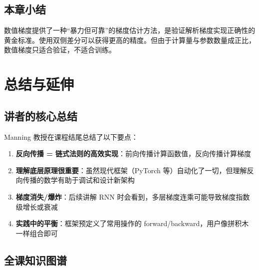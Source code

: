 \documentclass[a4paper]{article}
\begin{document}
\subsection{本章小结}

数值梯度提供了一种``暴力但可靠''的梯度估计方法，是验证解析梯度实现正确性的黄金标准。使用双侧差分可以获得更高的精度。但由于计算量与参数数量成正比，数值梯度只适合验证，不适合训练。


\section{总结与延伸}

\subsection{讲者的核心总结}




Manning 教授在课程结尾总结了以下要点：

\begin{enumerate}
    \item \textbf{反向传播 = 链式法则的高效实现}：前向传播计算函数值，反向传播计算梯度
    \item \textbf{理解底层原理很重要}：虽然现代框架（PyTorch 等）自动化了一切，但理解反向传播的数学有助于调试和设计新架构
    \item \textbf{梯度消失/爆炸}：后续讲解 RNN 时会看到，多层梯度连乘可能导致梯度指数级增长或衰减
    \item \textbf{实践中的平衡}：框架预定义了常用操作的 forward/backward，用户像拼积木一样组合即可
\end{enumerate}

\subsection{全课知识图谱}
\end{document}

